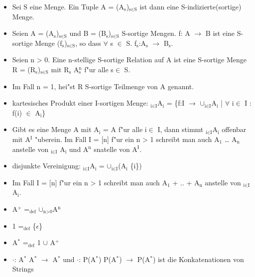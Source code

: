 \documentclass[11pt]{article}
\begin{document}
\begin{itemize}
\item Sei S eine Menge. Ein Tuple A = (A$_{\text{s}}$)$_{\text{s} \in \text{S}}$ ist dann eine S-indizierte(sortige) Menge.
\item Seien A = (A$_{\text{s}}$)$_{\text{s} \in \text{S}}$ und B = (B$_{\text{s}}$)$_{\text{s} \in\text{S}}$ S-sortige Mengen. f: A $\to$ B ist eine S-sortige Menge (f$_{\text{s}}$)$_{\text{s} \in \text{S}}$, so dass $\forall$ s $\in$ S. f$_{\text{s}}$:A$_{\text{s}}$ $\to$ B$_{\text{s}}$.
\item Seien n > 0. Eine n-stellige S-sortige Relation auf A ist eine S-sortige Menge R = (R$_{\text{s}}$)$_{\text{s} \in \text{S}}$ mit R$_{\text{s}}$ \subseteq A$_{\text{s}}^{\text{n}}$ f"ur alle  s$\in$ S.
\item Im Fall n = 1, hei"st R S-sortige Teilmenge von A genannt.
\item kartesisches Produkt einer I-sortigen Menge: \texttimes{}$_{\text{i} \in \text{I}}$A$_{\text{i}}$ = \{f:I $\to$ $\cup$$_{\text{i} \in\text{I}}$A$_{\text{i}}$ | $\forall$ i$\in$ I : f(i) $\in$ A$_{\text{i}}$\}
\item Gibt es eine Menge A mit A$_{\text{i}}$ = A f"ur alle i$\in$ I, dann stimmt \texttimes{}$_{\text{i} \in \text{I}}$A$_{\text{i}}$ offenbar mit A$^{\text{I}}$ "uberein. Im Fall I = [n] f"ur ein n > 1 schreibt man auch A$_{\text{1}}$ \texttimes{} \ldots{} \texttimes{} A$_{\text{n}}$ anstelle von \texttimes{}$_{\text{i} \in \text{I}}$ A$_{\text{i}}$ und A$^{\text{n}}$ snatelle von A$^{\text{I}}$.
\item disjunkte Vereinigung: \uplus$_{\text{i} \in \text{I}}$A$_{\text{i}}$ = $\cup$$_{\text{i} \in \text{I}}$(A$_{\text{i}}$ \texttimes{} \{i\})
\item Im Fall I = [n] f"ur ein n > 1 schreibt man auch A$_{\text{1}}$ + .. + A$_{\text{n}}$ anstelle von \uplus$_{\text{i} \in \text{I}}$A$_{\text{i}}$.
\item A$^{\text{+}}$ =$_{\text{def}}$ $\cup$$_{\text{n>0}}$A$^{\text{n}}$
\item 1 =$_{\text{def}}$ \{$\epsilon$\}
\item A$^{\text{*}}$ =$_{\text{def}}$ 1 $\cup$ A$^{\text{+}}$
\item $\cdot$: A$^{\text{*}}$ \texttimes{} A$^{\text{*}}$ $\to$ A$^{\text{*}}$ und $\cdot$: P(A$^{\text{*}}$) \texttimes{} P(A$^{\text{*}}$) $\to$ P(A$^{\text{*}}$) ist die Konkatenationen von Strings
\end{itemize}
\end{document}
